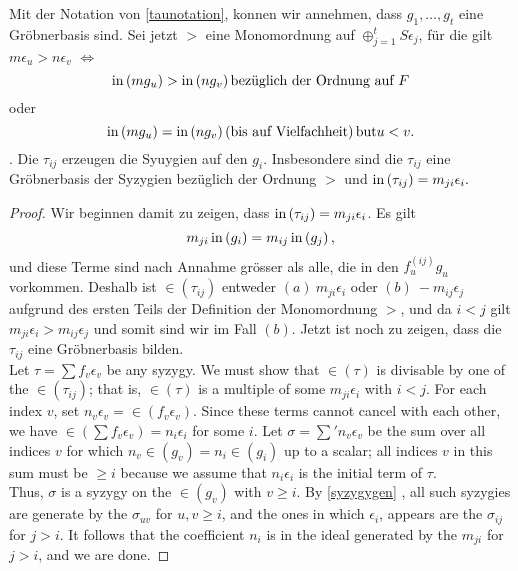\documentclass{article}
\begin{document}
\begin{thm}[Schreyer \cite{Eis1}[15.10]
	Mit der Notation von \ref{taunotation}, 
	konnen wir annehmen,
	dass
	\( g_1,\dots,g_t\)
	eine Gr\"obnerbasis sind.
	Sei jetzt 
	\( > \) 
	eine Monomordnung auf 
	\( \oplus_{j=1}^t S \epsilon_{j} \),
	f\"ur die gilt
	\( m \epsilon_{u} > n \epsilon_{v} \)
	\(\iff\)
	\[
		\operatorname{in}\left(  m g_{u} \right) > \operatorname{in}\left( n g_{v} \right) 
		\text{bez\"uglich der Ordnung auf } F 
	\]
	oder
	\[
		\operatorname{in}\left( m g_{u} \right) = \operatorname{in}\left( n g_{v} \right) 
		\left( \text{bis auf Vielfachheit} \right) \text{but} u < v.
	\].
	Die
	\( \tau_{ij} \) 
	erzeugen die Syuygien auf den
	\( g_{i} \).
	Insbesondere sind die
	\( \tau_{ij} \)
	eine Gr\"obnerbasis der Syzygien bez\"uglich der Ordnung
	\( > \)
	und 
	\( \operatorname{in}\left( \tau_{ij} \right) = m_{ji}\epsilon_{i}.\)
{\color{blue}
	\begin{proof}
		Wir beginnen damit zu zeigen, dass
		\( \operatorname{in} \left( \tau_{ij} \right) 
		=
		m_{ji} \epsilon_{i} \).
		Es gilt 
		\[
			m_{ji} \operatorname{in} \left( g_{i} \right) 
			= m_{ij} \operatorname{in} \left( g_{j} \right),
		\]
		und diese Terme sind nach Annahme gr\"osser als alle,
		die in den 
		\( f_{u}^{\left( ij \right)} g_{u} \)
		vorkommen.
		Deshalb ist
		\( \in\left( \tau_{ij} \right) \)
		entweder
		\( (a) \ m_{ji} \epsilon_{i} \)
		oder
		\( (b) \ -m_{ij}\epsilon_{j} \)
		aufgrund des ersten Teils der Definition der Monomordnung
		\( > \),
		und da
		\( i < j \)
		gilt
		\( m_{ji} \epsilon_{i} 
		> m_{ij}\epsilon_{j} \)
		und somit sind wir im Fall 
		\( (b ) \).
		Jetzt ist noch zu zeigen,
		dass die 
		\( \tau_{ij} \)
		eine Gr\"obnerbasis bilden. \\
Let
\( \tau = \sum f_{v} \epsilon_{v}\)
be any syzygy.
We must show that
\( \in\left( \tau \right) \)
is divisable by one of the
\( \in\left( \tau_{ij} \right)\);
that is,
\( \in\left( \tau \right) \)
is a multiple of some
\( m_{ji} \epsilon_{i} \)
with
\( i<j \).
For each index
\(v \),
set
\(n_{v} \epsilon_{v}=\in\left( f_{v}\epsilon_{v} \right) \).
Since these terms cannot cancel with each other,
we have
\( \in\left( \sum f_{v}\epsilon_{v} \right)=n_{i}\epsilon_{i}\)
for some
\( i\).
Let
\( \sigma=\sum'n_{v} \epsilon_{v} \)
be the sum over all indices
\( v \)
for which
\( n_v \in \left( g_{v} \right)=n_{i} \in\left( g_{i} \right) \)
up to a scalar;
all indices
\( v \)
in this sum must be
\( \ge i \)
because we assume that
\( n_{i} \epsilon_{i} \)
is the initial term of
\( \tau \). \\
Thus,
\( \sigma \)
is a syzygy on the
\( \in\left( g_{v} \right) \)
with
\( v \ge i\).
By \ref{syzygygen} ,
all such syzygies are generate by the
\( \sigma_{uv} \)
for
\( u,v \ge i \),
and the ones in which
\( \epsilon_{i} \),
appears are the
\( \sigma_{ij}\)
for
\( j > i \).
It follows that the coefficient
\(n_{i}\)
is in the ideal generated by the
\(m_{ji}\)
for
\( j> i \),
and we are done.
\end{proof}
}
\end{thm}
\end{document}
